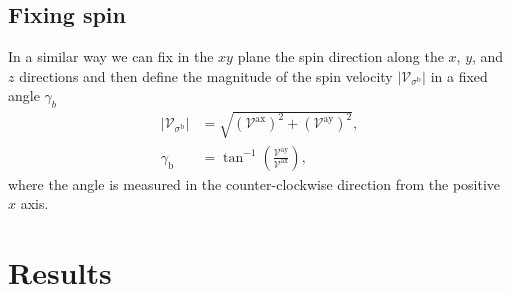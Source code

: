 \documentclass[prb,11pt,tightenlines,twocolumn,aps]{revtex4-1}
\begin{document}

\subsection{Fixing spin}\label{sec:theory-fixspin}
In a similar way we can fix in the $xy$ plane the spin direction along the $x$,
$y$, and $z$ directions and then define the magnitude of the spin velocity $|\mathcal{V}_{\sigma^{\mathrm{b}}}|$ in a fixed angle $\gamma_{b}$
\begin{align}
|\mathcal{V}_{\sigma^{\mathrm{b}}}| 
&=
\sqrt{
(\mathcal{V}^{\mathrm{ax}})^{2} +
(\mathcal{V}^{\mathrm{ay}})^{2} 
}, \\
\gamma_{\mathrm{b}} 
&=
\tan^{-1} \left( \frac{\mathcal{V}^{\mathrm{ay}}}
{\mathcal{V}^{\mathrm{ax}}} \right),
\end{align}
where the angle is measured in the counter-clockwise direction from the positive
$x$ axis.



\section{Results} %
\label{sec:results}
\end{document}
